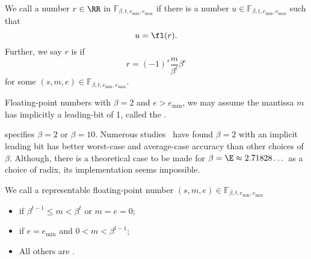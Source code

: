 \begin{defn}
  We call a number $r\in\RR$  in
  $\mathbb{F}_{\beta,t,e_{\text{min}},e_{\text{max}}}$ if there is a
  number $u\in\mathbb{F}_{\beta,t,e_{\text{min}},e_{\text{max}}}$ such
  that
  \begin{equation}
    u = \fl(r).
  \end{equation}
  Further, we say $r$ is  if
  \begin{equation}
    r = (-1)^{s}\frac{m}{\beta^{t}}\beta^{e}
  \end{equation}
  for some $(s,m,e)\in\mathbb{F}_{\beta,t,e_{\text{min}},e_{\text{max}}}$.
\end{defn}


\begin{defn}
  Floating-point numbers with $\beta=2$ and $e>e_{\text{min}}$, we may
  assume the mantissa $m$ has implicitly a leading-bit of 1,
  called the .
\end{defn}


\begin{rmk}
   specifies $\beta=2$ or $\beta=10$. Numerous studies~\cite{DBLP:journals/corr/abs-1004-3374,10.1145/363235.363240,5009112,10.1145/362003.362013,4039164}
have found $\beta=2$ with an implicit leading bit has better worst-case
and average-case accuracy than other choices of $\beta$. Although, there
is a theoretical case to be made for $\beta=\E\approx2.71828\dots$ as a
choice of radix, its implementation seems impossible.
\end{rmk}


\begin{defn}\label{def:computer-float:normal-subnormal-denormal}
We call a representable floating-point number $(s,m,e)\in\mathbb{F}_{\beta,t,e_{\text{min}},e_{\text{max}}}$
\begin{itemize}
\item{} if $\beta^{t-1}\leq m<\beta^{t}$ or $m=e=0$;
\item{} if $e=e_{\text{min}}$ and $0<m<\beta^{t-1}$;
\item All others are .
\end{itemize}
\end{defn}


